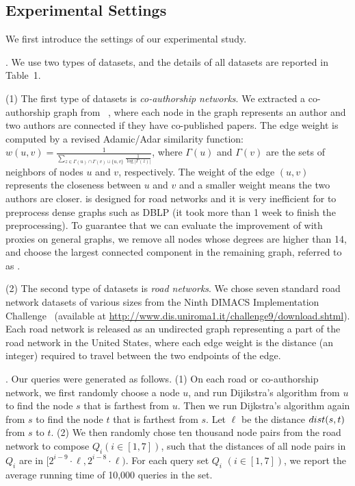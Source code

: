 \subsection{Experimental Settings}
We first introduce the settings of our experimental study.







.
We use two types of datasets, and the details of all datasets are reported in Table~1.



\sstab (1) The first type of datasets is {\em co-authorship networks}. We extracted a co-authorship graph from \dblp~\cite{snapnets}, where each node in the graph represents an author and two authors are connected if they have co-published papers. The edge weight is computed by a revised Adamic/Adar similarity function: $w(u,v) = \frac{1}{\sum_{z\in {\Gamma(u)\cap \Gamma(v) \cup \{u,v\}}}\frac{1}{\log{|\Gamma(z)|}}}$, where $\Gamma(u)$ and $\Gamma(v)$ are the sets of neighbors of nodes $u$ and $v$, respectively. The weight of the edge $(u,v)$ represents the closeness between $u$ and $v$ and a smaller weight means the two authors are closer. \tnr is designed for road networks and it is very inefficient for \tnr to preprocess dense graphs such as DBLP (it took more than 1 week to finish the preprocessing). To guarantee that we can evaluate the improvement of \tnr with proxies on general graphs, we remove all nodes whose degrees are higher than 14, and choose the largest connected component in the remaining graph, referred to as \dblpone.


\sstab (2) The second type of datasets is {\em road networks}. We chose seven standard road network datasets of various sizes from the Ninth DIMACS
Implementation Challenge~\cite{dimacs-datasets} (available at {\url{http://www.dis.uniroma1.it/challenge9/download.shtml}}). Each road network is released as an undirected graph representing a part of the road network in the United States, where each edge weight is the distance (an integer) required to travel between the two endpoints of the edge.


. Our queries were generated as follows.
(1) On each road  or co-authorship network, we first randomly choose a node $u$, and run Dijikstra's algorithm from $u$ to find the node $s$ that is farthest from $u$. Then we run Dijkstra's algorithm again from $s$ to find the node $t$ that is farthest from $s$. Let $\ell$ be the distance $\dist(s,t)$ from $s$ to $t$.
(2) We then randomly chose ten thousand node pairs from
the road network to compose $Q_i (i \in [1,7])$, such that the
distances of all node pairs in $Q_i$ are in $[2^{i-9}\cdot\ell, 2^{i-8}\cdot\ell)$.
For each query set $Q_i$ $(i\in [1,7])$, we report the average running time of 10,000 queries in the set.

